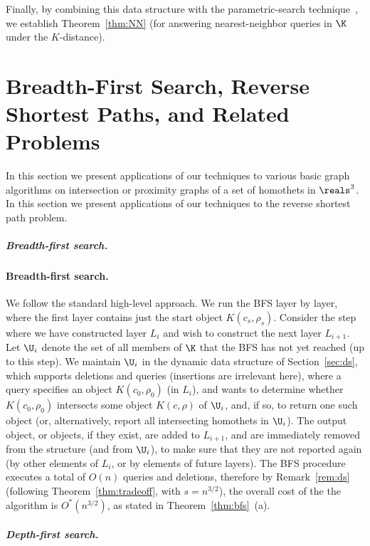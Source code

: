 \fi
%
Finally, by combining this data structure with the parametric-search technique~\cite{AM93}, 
we establish Theorem~\ref{thm:NN} (for answering nearest-neighbor queries in $\K$ under the $K$-distance).
%
%
\iffullver
\section{Breadth-First Search, Reverse Shortest Paths, and Related Problems} 
\label{sec:bfs-rsp}
%
In this section we present applications of our techniques to various basic graph algorithms
on intersection or proximity graphs of a set of homothets in $\reals^3$.
%
In this section we present applications of our techniques to the reverse shortest path problem.
%
\ifsocgproc 
\subparagraph*{Breadth-first search.}
\else
\paragraph{Breadth-first search.}
\fi
We follow the standard high-level approach. We run the BFS layer by layer, where the first layer
contains just the start object $K(c_s,\rho_s)$. Consider the step where we have constructed layer 
$L_i$ and wish to construct the next layer $L_{i+1}$. Let $\U_i$ denote the set of all members of 
$\K$ that the BFS has not yet reached (up to this step). We maintain $\U_i$ in the dynamic data 
structure of Section~\ref{sec:ds}, which supports deletions and queries (insertions are irrelevant 
here), where a query specifies an object $K(c_0,\rho_0)$ 
(in $L_i$), and wants to determine whether $K(c_0,\rho_0)$ intersects some object $K(c,\rho)$ of 
$\U_i$, and, if so, to return one such object (or, alternatively, report all intersecting homothets
in $\U_i$). The output object, or objects, if they exist, are added to $L_{i+1}$,
and are immediately removed from the structure (and from $\U_i$), to make sure that they are not reported 
again (by other elements of $L_i$, or by elements of future layers).
%
The BFS procedure executes a total of $O(n)$ queries and deletions, therefore by Remark~\ref{rem:ds} 
(following Theorem~\ref{thm:tradeoff}, with $s=n^{3/2}$),
the overall cost of the the algorithm is $O^*(n^{3/2})$, as stated in
Theorem~\ref{thm:bfs}~(a).
%
\ifsocgproc
\subparagraph*{Depth-first search.}
\else
